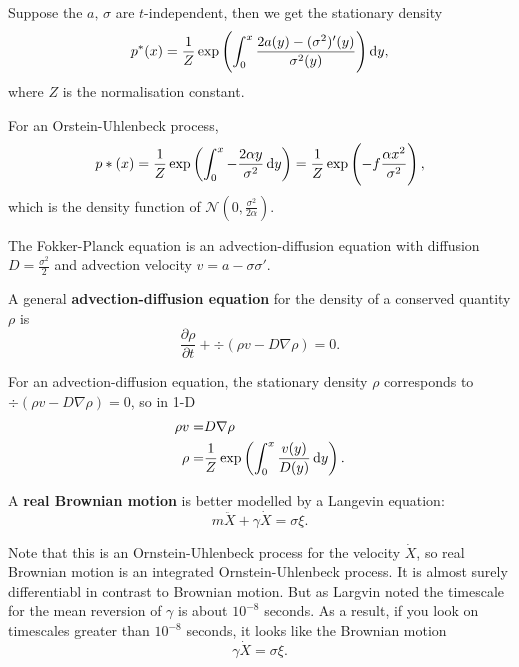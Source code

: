 Suppose the $a, \, \sigma$ are $t$-independent, then we get the stationary density 
\begin{equation*}
    p^*(x) = \frac{1}{Z} \exp\left( \int_0^x \frac{2 a(y) - (\sigma^2)'(y)}{\sigma^2(y)} \right) \dif y,
\end{equation*}
where $Z$ is the normalisation constant.
\begin{example}
    For an Orstein-Uhlenbeck process, 
    \begin{equation*}
        p*(x) = \frac{1}{Z} \exp \left( \int_0^x - \frac{2 \alpha y}{\sigma^2} \dif y \right) = \frac{1}{Z} \exp \left( - f\frac{\alpha x^2}{\sigma^2} \right), 
    \end{equation*}
    which is the density function of $\mathcal{N} (0, \frac{\sigma^2}{2\alpha})$.
\end{example}

\begin{proposition}
    The Fokker-Planck equation is an advection-diffusion equation with diffusion $D = \frac{\sigma^2}{2}$ and advection velocity $v = a - \sigma \sigma'$.
\end{proposition}

\begin{definition}
    A general \textbf{advection-diffusion equation} for the density of a conserved quantity $\rho$ is 
    \begin{equation*}
        \frac{\partial \rho}{\partial t} + \div (\rho v - D \nabla \rho) = 0.
    \end{equation*}
\end{definition}

\begin{remark}
    For an advection-diffusion equation, the stationary density $\rho$ corresponds to $\div (\rho v - D \nabla \rho) = 0$, so in 1-D
    \begin{align*}
        \rho v = & D \nabla \rho \\ 
        \rho = & \frac{1}{Z} \exp \left( \int_0^x \frac{v(y)}{D(y)} \dif y \right).
    \end{align*}
\end{remark}

\begin{definition}
    A \textbf{real Brownian motion} is better modelled by a Langevin equation:
    \begin{equation*}
        m \ddot{X} + \gamma \dot{X} = \sigma \xi.
    \end{equation*}
\end{definition}

\begin{remark}
    Note that this is an Ornstein-Uhlenbeck process for the velocity $\dot{X}$, so real Brownian motion is an integrated Ornstein-Uhlenbeck process. It is almost surely differentiabl in contrast to Brownian motion. But as Largvin noted the timescale for the mean reversion of $\gamma$ is about $10^{-8}$ seconds. As a result, if you look on timescales greater than $10^{-8}$ seconds, it looks like the Brownian motion 
    \begin{equation*}
        \gamma \dot{X} = \sigma \xi.
    \end{equation*}
\end{remark}
